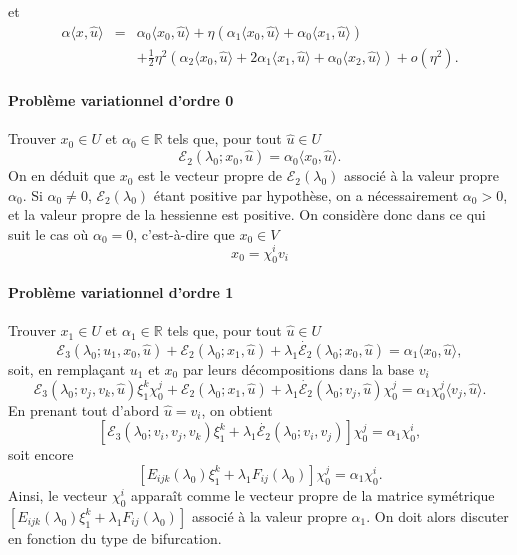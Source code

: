 \documentclass{article}
\begin{document}
et
\begin{eqnarray*}
  \alpha \langle x, \hat{u} \rangle & = & \alpha_0  \langle x_0, \hat{u}
  \rangle + \eta (\alpha_1 \langle x_0, \hat{u} \rangle + \alpha_0 \langle
  x_1, \hat{u} \rangle)\\
  &  & + \tfrac{1}{2} \eta^2  (\alpha_2 \langle x_0, \hat{u} \rangle + 2
  \alpha_1 \langle x_1, \hat{u} \rangle + \alpha_0 \langle x_2, \hat{u}
  \rangle) + o (\eta^2) .
\end{eqnarray*}
\paragraph{Problème variationnel d'ordre 0}Trouver $x_0 \in U$ et
$\alpha_0 \in \mathbb{R}$ tels que, pour tout $\hat{u} \in U$
\[ \mathcal{E}_2 (\lambda_0 ; x_0, \hat{u}) = \alpha_0  \langle x_0, \hat{u}
   \rangle . \]
On en déduit que $x_0$ est le vecteur propre de $\mathcal{E}_2
(\lambda_0)$ associé à la valeur propre $\alpha_0$. Si $\alpha_0 \neq
0$, $\mathcal{E}_2  (\lambda_0)$ étant positive par hypothèse, on a
nécessairement $\alpha_0 > 0$, et la valeur propre de la hessienne est
positive. On considère donc dans ce qui suit le cas où $\alpha_0 = 0$,
c'est-à-dire que $x_0 \in V$
\[ x_0 = \chi_0^i v_i \]


\paragraph{Problème variationnel d'ordre 1}Trouver $x_1 \in U$ et
$\alpha_1 \in \mathbb{R}$ tels que, pour tout $\hat{u} \in U$
\[ \mathcal{E}_3 (\lambda_0 ; u_1, x_0, \hat{u}) +\mathcal{E}_2 (\lambda_0 ;
   x_1, \hat{u}) + \lambda_1  \dot{\mathcal{E}_2} (\lambda_0 ; x_0, \hat{u}) =
   \alpha_1  \langle x_0, \hat{u} \rangle, \]
soit, en rempla{\c c}ant $u_1$ et $x_0$ par leurs décompositions dans la
base $v_i$
\[ \mathcal{E}_3 (\lambda_0 ; v_j, v_k, \hat{u}) \xi_1^k \chi_0^j
   +\mathcal{E}_2 (\lambda_0 ; x_1, \hat{u}) + \lambda_1  \dot{\mathcal{E}_2}
   (\lambda_0 ; v_j, \hat{u}) \chi_0^j = \alpha_1 \chi_0^j  \langle v_j,
   \hat{u} \rangle . \]
En prenant tout d'abord $\hat{u} = v_i$, on obtient
\[ [\mathcal{E}_3 (\lambda_0 ; v_i, v_j, v_k) \xi_1^k + \lambda_1
   \dot{\mathcal{E}_2} (\lambda_0 ; v_i, v_j)] \chi_0^j = \alpha_1 \chi_0^i,
\]
soit encore
\[ [E_{i  j  k} (\lambda_0) \xi_1^k + \lambda_1 F_{i
   j} (\lambda_0)] \chi_0^j = \alpha_1 \chi_0^i . \]
Ainsi, le vecteur $\chi_0^i$ apparaît comme le vecteur propre de la
matrice symétrique $[E_{i  j  k} (\lambda_0) \xi_1^k +
\lambda_1 F_{i  j} (\lambda_0)]$ associé à la valeur propre
$\alpha_1$. On doit alors discuter en fonction du type de bifurcation.
\end{document}
